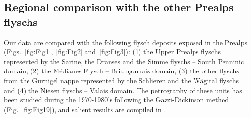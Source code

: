 \documentclass[twoside]{article}
\begin{document}
\subsection{Regional comparison with the other Prealps flyschs}

Our data are compared with the following flysch deposits exposed in the Prealps (Figs.~\ref{fig:Fig1},~\ref{fig:Fig2} and~\ref{fig:Fig3}): (1) the Upper Prealps flyschs \citep{Caron1972a,Fluck1973,Gasinski1997} represented by the Sarine, the Dranses and the Simme flyschs – South Penninic domain, (2) the Médianes Flysch \citep{Fluck1973,Caron1989} – Briançonnais domain, (3) the other flyschs from the Gurnigel nappe represented by the Schlieren \citep{Winkler1983,Winkler1984} and the Wägital flyschs \citep{Winkler1985b} and (4) the Niesen flyschs \citep{Ackermann1984,Ackermann1986} – Valais domain. The petrography of these units has been studied during the 1970-1980’s following the Gazzi-Dickinson method (Fig.~\ref{fig:Fig19}), and salient results are compiled in \cite{Caron1989}.\par
\medskip

\end{document}
